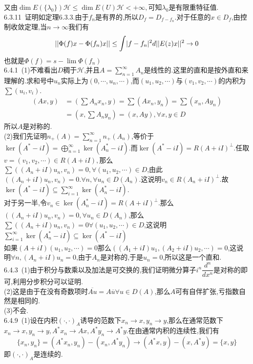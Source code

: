 \documentclass[b5paper]{ctexart}
\begin{document}
又由$\dim E(\{\lambda_0\})\mathscr{H}\leq \dim E(U)\mathscr{H}<+\infty,$可知$\lambda_0$是有限重特征值.\\
6.3.11~证明如定理6.3.3.由于$f_n$是有界的,所以$D_f=D_{f-f_n}$.对于任意的$x\in D_f$,由控制收敛定理,当$n\to \infty$我们有\\
\[||\Phi(f)x-\Phi(f_n)x||\leq\mathlarger{\int}|f-f_n|^2d||E(z)x||^2\to 0\]
也就是$\Phi(f)=s-\lim \Phi(f_n)$\\
6.4.1~(1)不难看出$D$稠于$\mathscr{H}$,并且$A=\sum\limits_{n=1}^{\infty}A_n$是线性的.这里的直和是按外直和来理解的.求和号中$u_n$实际上为$(0,\cdots,u_n,\cdots)$,而$(u_1,u_2,\cdots)$与$(v_1,v_2,\cdots)$的内积为$\sum(u_i,v_i)$.
\[\begin{array}{rl}
(Ax,y)&=(\sum A_nx_n,y)=\sum(Ax_n,y_n)=\sum(x_n,Ay_n)\\
&=(x,\sum A_ny_n)=(x,Ay),\forall x,y\in D
\end{array}\]
所以$A$是对称的.\\
(2)我们先证明$n_+(A)=\sum\limits_{n=1}^\infty n_+(A_n)$,等价于$\ker (A^*-iI)=\bigoplus\limits_{n=1}^\infty\ker(A^*_n-iI)$.而$\ker (A^*-iI)=R(A+iI)^\perp.$任取$v=(v_1,v_2,\cdots)\in R(A+iI),$那么$\sum((A_n+iI)u_n,v_n)=0,\forall (u_1,u_2,\cdots)\in D$,由此$((A_n+iI)u_n,v_n)=0.\forall n,\forall u_n\in D(A_n).$这说明$v_n\in R(A_n+iI)^\perp$.故$\ker (A^*-iI)\subseteq \sum\limits_{i=1}^\infty \ker(A^*_n-iI).$\\
对于另一半,令$v_n\in\ker(A^*_n-iI)=R(A+iI)^\perp.$那么$((A_n+iI)u_n,v_n)=0,\forall u_n\in D(A_n)$,那么$\sum((A_n+iI)u_n,v_n)=0\forall (u_1,u_2,\cdots)\in D$,这说明$\sum\limits_{i=1}^\infty \ker(A^*_n-iI)\subseteq \ker(A^*-iI)$\\
如果$(A+iI)(u_1,u_2,\cdots)=0$那么$((A_1+iI)u_1,(A_2+iI)u_2,\cdots)=0$,这说明$\forall n,(A_n+iI)u_n=0$,由于$A_n$是对称的,于是$u_n=0$,所以这是一个直和.\\
6.4.3~(1)由于积分与数乘以及加法是可交换的,我们证明微分算子$i^n\dfrac{d^n}{dx^n}$是对称的即可,利用分步积分可以证明.\\
(2)这是由于在没有奇数项时$\overline{Au}=A\overline{u}\forall u\in D(A)$,那么$A$可有自伴扩张,亏指数自然是相同的.\\
(3)不会.\\
6.4.9~(1)设在内积$(\cdot,\cdot)_A$诱导的范数下$x_n\to x,y_n\to y$,那么在通常范数下$x_n\to x,y_n\to y,A^*x_n\to Ax,A^*y_n\to A^*y$.在由通常内积的连续性,我们有
\[\{x_n,y_n\}=(A^*x_n,y_n)-(x_n,A^*y_n)\to (A^*x,y)-(x,A^*y)=\{x,y\}\]
即$(\cdot,\cdot)_A$是连续的.\\
\end{document}
